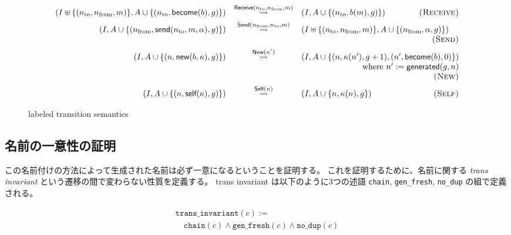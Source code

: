 \begin{figure}[t]
  \begin{displaymath}
    \begin{array}{rcl}
      (I \uplus \{(n_{\textrm{to}}, n_{\textrm{from}}, m)\}, A \cup \{(n_{\textrm{to}}, \textsf{become}(b), g)\}) &
      \overset{\textsf{Receive}(n_{\textrm{to}}, n_{\textrm{from}}, m)}{\leadsto} &
      (I, A \cup \{(n_{\textrm{to}}, b(m), g)\})
      \hfill \textsc{(Receive)} \\[1ex]

      (I, A \cup \{(n_{\textrm{from}}, \textsf{send}(n_{\textrm{to}}, m, \alpha), g)\}) &
      \overset{\textsf{Send}(n_{\textrm{from}}, n_{\textrm{to}}, m)}{\leadsto} &
      (I \uplus \{(n_{\textrm{to}}, n_{\textrm{from}}, m)\}, A \cup \{(n_{\textrm{from}}, \alpha, g)\}) \\
      & & \hfill \textsc{(Send)} \\[1ex]

      (I, A \cup \{(n, \textsf{new}(b, \kappa), g)\}) &
      \overset{\textsf{New}(n')}{\leadsto} &
      (I, A \cup \{(n, \kappa(n'), g + 1), (n', \textsf{become}(b), 0)\}) \\
      & & \hfill \textrm{where}\ n' := \textsf{generated}(g, n) \\
      & & \hfill \textsc{(New)} \\[1ex]

      (I, A \cup \{(n, \textsf{self}(\kappa), g)\}) &
      \overset{\textsf{Self}(n)}{\leadsto} &
      (I, A \cup \{n, \kappa(n), g\})
      \hfill \textsc{(Self)}
    \end{array}
  \end{displaymath}
  \caption{labeled transition semantics}\label{expr:formalization:semantics}
\end{figure}



\subsection{名前の一意性の証明}

この名前付けの方法によって生成された名前は必ず一意になるということを証明する。
これを証明するために、名前に関する \textit{trans invariant} という遷移の間で変わらない性質を定義する。
trans invariant は以下のように3つの述語 \texttt{chain}, \texttt{gen\_fresh}, \texttt{no\_dup} の組で定義される。

\begin{displaymath}
  \begin{array}{l}
    \texttt{trans\_invariant}(c) := \\
    \quad \texttt{chain}(c) \wedge \texttt{gen\_fresh}(c) \wedge \texttt{no\_dup}(c)
  \end{array}
\end{displaymath}

